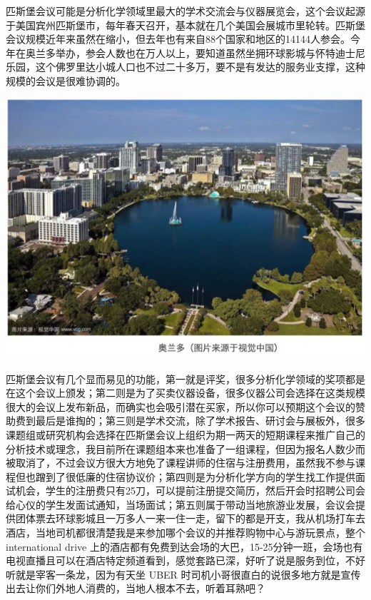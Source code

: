 \documentclass[
]{book}
\begin{document}
匹斯堡会议可能是分析化学领域里最大的学术交流会与仪器展览会，这个会议起源于美国宾州匹斯堡市，每年春天召开，基本就在几个美国会展城市里轮转。匹斯堡会议规模近年来虽然在缩小，但去年也有来自88个国家和地区的14144人参会。今年在奥兰多举办，参会人数也在万人以上，要知道虽然坐拥环球影城与怀特迪士尼乐园，这个佛罗里达小城人口也不过二十多万，要不是有发达的服务业支撑，这种规模的会议是很难协调的。

\includegraphics[width=8.33in]{images/pittcon1}

匹斯堡会议有几个显而易见的功能，第一就是评奖，很多分析化学领域的奖项都是在这个会议上颁发；第二则是为了买卖仪器设备，很多仪器公司会选择在这类规模很大的会议上发布新品，而确实也会吸引潜在买家，所以你可以预期这个会议的赞助费到最后是谁掏的；第三则是学术交流，除了学术报告、研讨会与展板外，很多课题组或研究机构会选择在匹斯堡会议上组织为期一两天的短期课程来推广自己的分析技术或理念，我目前所在课题组本来也准备了一组课程，但因为报名人数少而被取消了，不过会议方很大方地免了课程讲师的住宿与注册费用，虽然我不参与课程但也蹭到了很低廉的住宿协议价；第四则是为分析化学方向的学生找工作提供面试机会，学生的注册费只有25刀，可以提前注册提交简历，然后开会时招聘公司会给心仪的学生发面试通知，当场面试；第五则属于带动当地旅游业发展，会议会提供团体票去环球影城且一万多人一来一住一走，留下的都是开支，我从机场打车去酒店，当地司机都很清楚我是来参加哪个会议的并推荐购物中心与游玩景点，整个 international drive 上的酒店都有免费到达会场的大巴，15-25分钟一班，会场也有电视直播且可以在酒店特定频道看到，感觉套路已深，好听了说是服务到位，不好听就是宰客一条龙，因为有天坐 UBER 时司机小哥很直白的说很多地方就是宣传出去让你们外地人消费的，当地人根本不去，听着耳熟吧？
\end{document}
